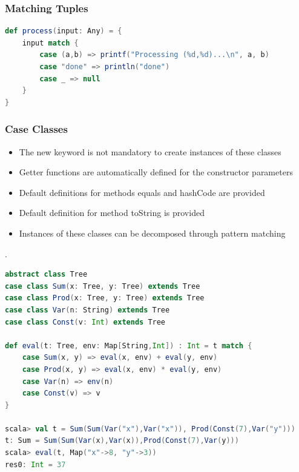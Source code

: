 \hypertarget{matching-tuples}{%
\subsubsection{Matching Tuples}\label{matching-tuples}}

\begin{lstlisting}[language=scala]
def process(input: Any) = {
    input match {
        case (a,b) => printf("Processing (%d,%d)...\n", a, b)
        case "done" => println("done")
        case _ => null
    }
}
\end{lstlisting}

\hypertarget{case-classes}{%
\subsubsection{Case Classes}\label{case-classes}}

\begin{itemize}
\tightlist
\item
  The new keyword is not mandatory to create instances of these classes
\item
  Getter functions are automatically defined for the constructor
  parameters
\item
  Default definitions for methods equals and hashCode are provided
\item
  Default definition for method toString is provided
\item
  Instances of these classes can be decomposed through pattern matching
\end{itemize}

.

\begin{lstlisting}[language=scala]
abstract class Tree
case class Sum(x: Tree, y: Tree) extends Tree
case class Prod(x: Tree, y: Tree) extends Tree
case class Var(n: String) extends Tree
case class Const(v: Int) extends Tree

def eval(t: Tree, env: Map[String,Int]) : Int = t match {
    case Sum(x, y) => eval(x, env) + eval(y, env)
    case Prod(x, y) => eval(x, env) * eval(y, env)
    case Var(n) => env(n)
    case Const(v) => v
}

scala> val t = Sum(Sum(Var("x"),Var("x")), Prod(Const(7),Var("y")))
t: Sum = Sum(Sum(Var(x),Var(x)),Prod(Const(7),Var(y)))
scala> eval(t, Map("x"->8, "y"->3))
res0: Int = 37
\end{lstlisting}

\clearpage